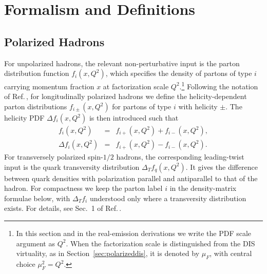 \documentclass[a4paper,11pt]{article}
\begin{document}
\section{Formalism and Definitions}\label{sec:formalism}
\subsection{Polarized Hadrons}

For unpolarized hadrons, the relevant non-perturbative input is the parton distribution function $f_i(x,Q^2)$, which specifies the density of partons of type $i$ carrying momentum fraction $x$ at factorization scale $Q^2$.\footnote{In this section and in the real-emission derivations we write the PDF scale argument as $Q^2$. When the factorization scale is distinguished from the DIS virtuality, as in Section~\ref{sec:polarizeddis}, it is denoted by $\mu_F$, with central choice $\mu_F^2=Q^2$.}
Following the notation of Ref.\,\cite{Barone:2001sp}, for longitudinally polarized hadrons
we define the helicity-dependent parton distributions $f_{i\pm}(x,Q^2)$ for partons of type $i$ with helicity $\pm$.
The helicity PDF $\Delta f_i(x,Q^2)$ is then introduced such that
\begin{subequations}
\begin{eqnarray}
  f_i(x,Q^2)        &=& f_{i+}(x,Q^2) + f_{i-}(x,Q^2),\\
  \Delta f_i(x,Q^2) &=& f_{i+}(x,Q^2) - f_{i-}(x,Q^2).
\end{eqnarray}
\end{subequations}
For transversely polarized spin-$1/2$ hadrons, the corresponding leading-twist input is the quark transversity distribution $\Delta_T f_q(x,Q^2)$. It gives the difference between quark densities with polarization parallel and antiparallel to that of the hadron. For compactness we keep the parton label $i$ in the density-matrix formulae below, with $\Delta_T f_i$ understood only where a transversity distribution exists. For details, see Sec.~1 of Ref.\,\cite{Barone:2001sp}.
\end{document}
